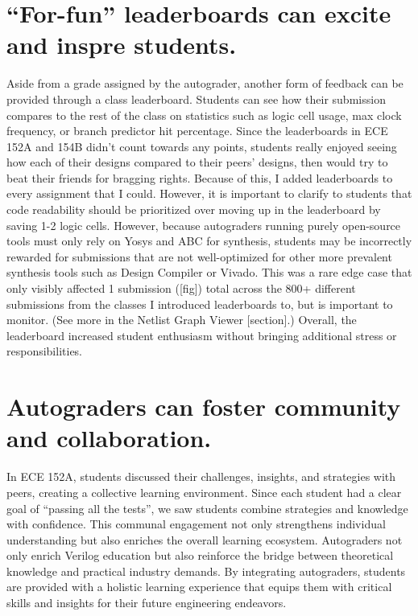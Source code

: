 \section{``For-fun'' leaderboards can excite and inspre students.}

Aside from a grade assigned by the autograder, another form of feedback can be provided through a class leaderboard. Students can see how their submission compares to the rest of the class on statistics such as logic cell usage, max clock frequency, or branch predictor hit percentage. Since the leaderboards in ECE 152A and 154B didn't count towards any points, students really enjoyed seeing how each of their designs compared to their peers' designs, then would try to beat their friends for bragging rights. Because of this, I added leaderboards to every assignment that I could. However, it is important to clarify to students that code readability should be prioritized over moving up in the leaderboard by saving 1-2 logic cells. However, because autograders running purely open-source tools must only rely on Yosys and ABC for synthesis, students may be incorrectly rewarded for submissions that are not well-optimized for other more prevalent synthesis tools such as Design Compiler or Vivado. This was a rare edge case that only visibly affected 1 submission ([fig]) total across the 800+ different submissions from the classes I introduced leaderboards to, but is important to monitor. (See more in the Netlist Graph Viewer [section].) Overall, the leaderboard increased student enthusiasm without bringing additional stress or responsibilities.

\section{Autograders can foster community and collaboration.}

In ECE 152A, students discussed their challenges, insights, and strategies with peers, creating a collective learning environment. Since each student had a clear goal of ``passing all the tests'', we saw students combine strategies and knowledge with confidence. This communal engagement not only strengthens individual understanding but also enriches the overall learning ecosystem. Autograders not only enrich Verilog education but also reinforce the bridge between theoretical knowledge and practical industry demands. By integrating autograders, students are provided with a holistic learning experience that equips them with critical skills and insights for their future engineering endeavors.
